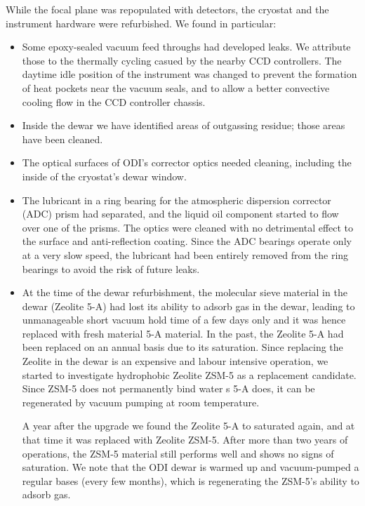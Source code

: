\documentclass[]{spieman}
\begin{document}
While the focal plane was repopulated with detectors, the cryostat and the 
instrument hardware were refurbished. We found in particular:
\begin{itemize}
	\item Some epoxy-sealed vacuum feed throughs had developed  leaks. We 
	attribute those to the thermally cycling casued by the nearby CCD controllers. 
	The daytime idle position of the instrument was changed to prevent the 
	formation of heat pockets near the vacuum seals, and to allow a better
	convective cooling flow in the CCD controller chassis.
	
	\item Inside the dewar we have identified areas of outgassing residue; 
	those areas have been cleaned. 
	
	\item The optical surfaces of ODI's corrector optics needed cleaning,
	 including the inside of the cryostat's dewar window. 
	
	\item The lubricant in a ring bearing for the atmospheric dispersion 
	corrector (ADC) prism had separated, and the liquid oil component started to 
	flow over one of the prisms. The optics were cleaned with no detrimental effect 
	to the surface and anti-reflection coating. Since the ADC bearings operate 
	only at a very slow speed, the lubricant had been entirely removed from the 
	ring bearings to avoid the risk of future leaks. 
	

\item  At the time of the dewar refurbishment, the molecular sieve material in
the dewar (Zeolite 5-A) had lost its ability to adsorb gas in the dewar, leading
to unmanageable short vacuum hold time of a few days only and it was hence 
replaced with fresh material 5-A material. In the past, the Zeolite 5-A had been
replaced on an annual basis due to its saturation. Since replacing the Zeolite
in the dewar is an expensive and labour intensive operation, we started to
investigate hydrophobic Zeolite ZSM-5 as a replacement candidate. Since ZSM-5
does not permanently bind water s 5-A does, it can be regenerated by vacuum
pumping at room temperature.

A year after the upgrade we found the Zeolite 5-A to  saturated again, and at
that time it was replaced with Zeolite ZSM-5. After more than two years of
operations, the ZSM-5 material still performs well and shows no signs of
saturation. We note that the ODI dewar is warmed up and vacuum-pumped a regular
bases (every few months), which is regenerating the ZSM-5's ability to adsorb
gas.

\end{itemize}
\end{document}
